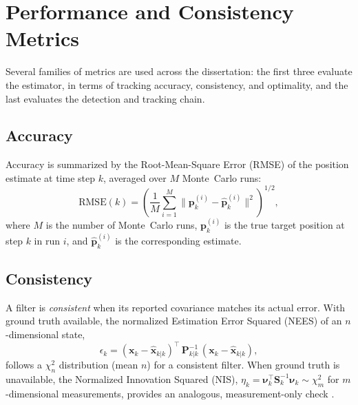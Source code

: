 \section{Performance and Consistency Metrics}

Several families of metrics are used across the dissertation: the first three
evaluate the estimator, in terms of tracking accuracy, consistency, and
optimality, and the last evaluates the detection and tracking chain.

\subsection{Accuracy}
Accuracy is summarized by the Root-Mean-Square Error (RMSE) of the position
estimate at time step $k$, averaged over $M$ Monte~Carlo runs:
\begin{equation}
  \mathrm{RMSE}(k)=\left(\frac1M\sum_{i=1}^{M}\big\lVert \bm{p}_k^{(i)}-\hat{\bm{p}}_k^{(i)}\big\rVert^2\right)^{1/2},
  \label{eq:rmse}
\end{equation}
where $M$ is the number of Monte~Carlo runs, $\bm{p}_k^{(i)}$ is the true target
position at step $k$ in run $i$, and $\hat{\bm{p}}_k^{(i)}$ is the corresponding
estimate.

\subsection{Consistency}
A filter is \emph{consistent} when its reported
covariance matches its actual error. With ground truth available, the normalized
Estimation Error Squared (NEES) of an $n$-dimensional state,
\begin{equation}
  \epsilon_k = (\bm{x}_k-\hat{\bm{x}}_{k|k})^{\top}\,\bm{P}_{k|k}^{-1}\,(\bm{x}_k-\hat{\bm{x}}_{k|k}),
  \label{eq:nees}
\end{equation}
follows a $\chi^2_n$ distribution (mean $n$) for a consistent filter. When ground
truth is unavailable, the Normalized Innovation Squared (NIS),
$\eta_k=\bm{\nu}_k^{\top}\bm{S}_k^{-1}\bm{\nu}_k\sim\chi^2_m$ for $m$-dimensional
measurements, provides an analogous, measurement-only check \cite{barshalom2001}.

